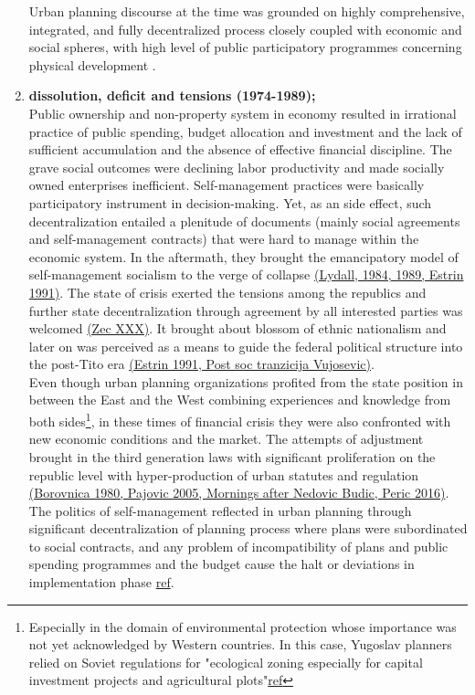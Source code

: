 \documentclass[11pt]{report}
\begin{document}
\begin{enumerate}
Urban planning discourse at the time was grounded on highly comprehensive, integrated, and fully decentralized process closely coupled with economic and social spheres, with high level of public participatory programmes concerning physical development \href{}{\citealt{nedovic-budic_mornings_2011}}.

\item \textbf{dissolution, deficit and tensions (1974-1989);}
\\
Public ownership and non-property system in economy resulted in irrational practice of public spending, budget allocation and investment and the lack of sufficient accumulation and the  absence  of  effective  financial  discipline.
The grave social outcomes were declining labor productivity and made socially owned enterprises inefficient.
Self-management practices were basically participatory instrument in decision-making. Yet, as an side effect, such decentralization entailed a plenitude of documents (mainly social agreements and self-management contracts) that were hard to manage within the economic system.
In the aftermath, they brought the emancipatory model of self-management socialism to the verge of collapse \href{}{(Lydall,  1984, 1989, Estrin 1991)}.
The state of crisis exerted the tensions among the republics and further state decentralization through  agreement  by  all  interested parties was welcomed \href{}{(Zec XXX)}. It brought about blossom of ethnic nationalism and later on was perceived as a means to guide  the  federal  political  structure  into  the post-Tito era \href{}{(Estrin 1991, Post soc tranzicija Vujosevic)}.
\\

Even though urban planning organizations profited from the state position in between the East and the West combining experiences and knowledge from both sides\footnote{Especially in the domain of environmental protection whose importance was not yet acknowledged by Western countries. In this case, Yugoslav planners relied on Soviet regulations for "ecological zoning especially for capital investment projects and agricultural plots"\href{}{ref}}, in these times of financial crisis they were also confronted with new economic conditions and the market.
The attempts of adjustment brought in the third generation laws with significant proliferation on the republic level with hyper-production of urban statutes and regulation \href{}{(Borovnica 1980, Pajovic 2005, Mornings after Nedovic Budic, Peric 2016)}.
The politics of self-management reflected in urban planning through significant decentralization of planning process where plans were subordinated to social contracts, and any problem of incompatibility of plans and public spending programmes and the budget cause the halt or deviations in implementation phase \href{}{ref}.


\end{enumerate}
\end{document}
